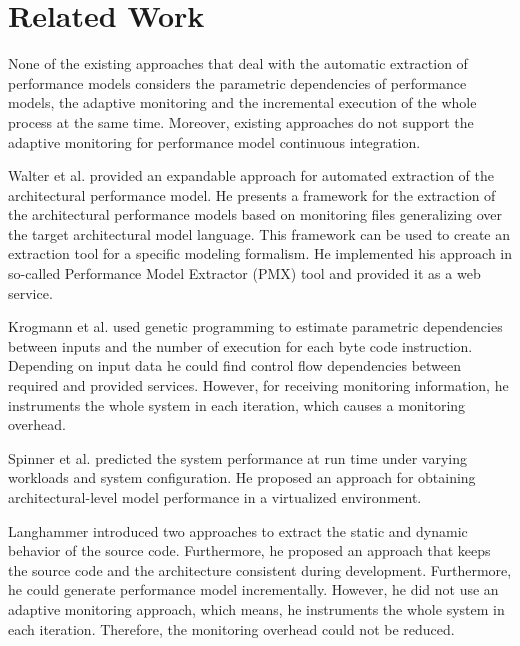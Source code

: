 
\chapter{Related Work}
\label{ch:Related Work}

None of the existing approaches that deal with the automatic extraction of performance
models considers the parametric dependencies of performance models, the adaptive
monitoring and the incremental execution of the whole process at the same time. Moreover,
existing approaches do not support the adaptive monitoring for performance model continuous
integration.

Walter et al. \cite{walter2017expandable} provided an expandable approach for automated extraction of the architectural performance model. He presents a framework for the extraction of
the architectural performance models based on monitoring files generalizing over
the target architectural model language. This framework can be used to create
an extraction tool for a specific modeling formalism. He implemented his approach
in so-called Performance Model Extractor (PMX) tool and provided it as a web service.

Krogmann et al. \cite{krogmann2012reconstruction, krogmann2010using} used genetic programming to estimate parametric dependencies between inputs and the number of execution for each byte code instruction.
Depending on input data he could find control flow dependencies between required
and provided services. However, for receiving monitoring information, he instruments the whole system in each iteration, which causes a monitoring overhead. 

Spinner et al. \cite{spinner2016reference} predicted the system performance at run time under varying workloads and system configuration. He proposed an approach for obtaining architectural-level model performance in a virtualized environment.

Langhammer \cite{langhammer2017automated} introduced two approaches to extract the static and dynamic
behavior of the source code. Furthermore, he proposed an approach that keeps the source code and the architecture consistent during development. Furthermore, he could generate performance model incrementally. However, he did not use an adaptive monitoring approach, which means, he instruments the whole system in each iteration. Therefore, the monitoring overhead could not be reduced.

